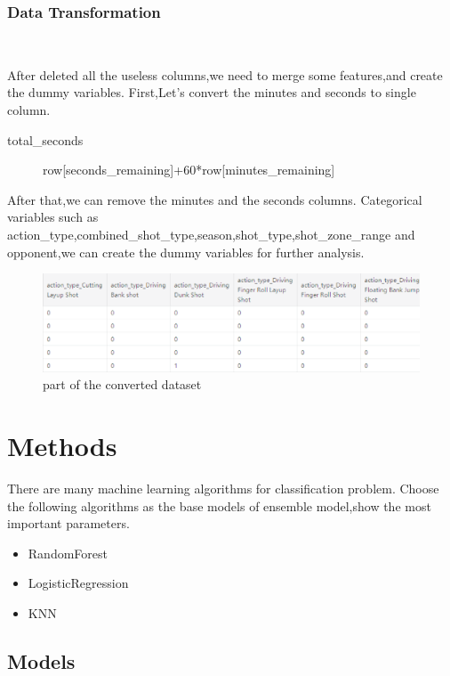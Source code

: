 \subsubsection{Data Transformation}
\

After deleted all the useless columns,we need to merge some features,and create the dummy variables.
First,Let's convert the minutes and seconds to single column.
\begin{description}
	\item[total\_seconds] row[seconds\_remaining]+60*row[minutes\_remaining] 
\end{description}
After that,we can remove the minutes and the seconds columns.
Categorical variables such as action_type,combined_shot_type,season,shot_type,shot_zone_range 
and opponent,we can create the dummy variables for further analysis.
\begin{figure}[htbp]
	\centering
	\includegraphics[scale=0.5]{u.eps
	}        %
	\caption{part of the converted dataset}
	\label{fig8}
\end{figure}
\newpage

\section{Methods}

There are many machine learning algorithms 
for classification problem. 
Choose the following algorithms
as the base models of ensemble model,show the most important parameters.

\begin{itemize}
	\item RandomForest 
	\item LogisticRegression

	\item KNN

\end{itemize}
\subsection{Models}
\

